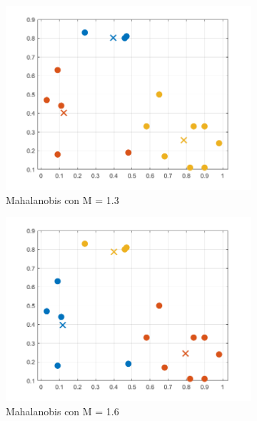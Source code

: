 \documentclass[11pt, letterpaper]{article}
\begin{document}
\begin{figure}[h!]
	\centering
	\begin{subfigure}[b]{0.50\textwidth}
		\includegraphics[width=\textwidth]{IMG/R21.png}
		\caption{Mahalanobis con M = 1.3}
		\label{fig:r4}
	\end{subfigure}\hfill
	\begin{subfigure}[b]{0.50\textwidth}
		\includegraphics[width=\textwidth]{IMG/R22.png}
		\caption{Mahalanobis con  M = 1.6}
		\label{fig:r5}
	\end{subfigure}
	\vspace{\baselineskip} %
	\begin{subfigure}[b]{0.50\textwidth}

\end{subfigure}
\end{figure}
\end{document}

